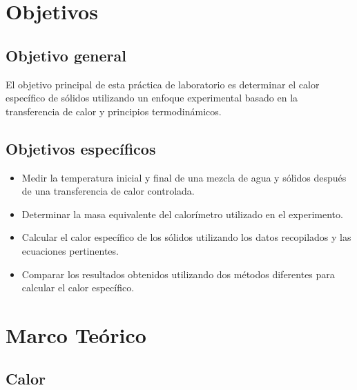 \documentclass[letterpaper, 12pt]{article}
\begin{document}
\section{Objetivos}

\subsection{Objetivo general}

El objetivo principal de esta práctica de laboratorio es
determinar el calor específico de sólidos utilizando un
enfoque experimental basado en la transferencia de calor y
principios termodinámicos.

\subsection{Objetivos específicos}

\begin{itemize}[label=$\triangleright$]
      \item Medir la temperatura inicial y final de una mezcla de agua
            y sólidos después de una transferencia de calor controlada.

      \item Determinar la masa equivalente del calorímetro utilizado en
            el experimento.

      \item Calcular el calor específico de los sólidos utilizando los
            datos recopilados y las ecuaciones pertinentes.

      \item Comparar los resultados obtenidos utilizando dos métodos
            diferentes para calcular el calor específico.
\end{itemize}

\section{Marco Teórico}

\subsection{Calor}
\end{document}
